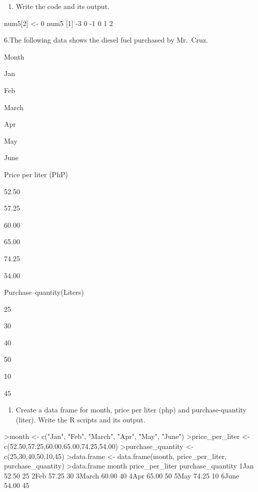 \documentclass[
]{article}
\newenvironment{Shaded}{\begin{snugshade}}{\end{snugshade}}
\newcommand{\NormalTok}[1]{#1}
\providecommand{\tightlist}{%
  \setlength{\itemsep}{0pt}\setlength{\parskip}{0pt}}
\begin{document}
\begin{enumerate}
\def\labelenumi{\alph{enumi}.}
\setcounter{enumi}{1}
\tightlist
\item
  Write the code and its output.
\end{enumerate}

\begin{Shaded}
\begin{Highlighting}[]
\NormalTok{num5[2] \textless{}{-} 0}
\NormalTok{num5}
\NormalTok{[1] {-}3  0 {-}1  0  1  2}
\end{Highlighting}
\end{Shaded}

6.The following data shows the diesel fuel purchased by Mr.~Cruz.

Month

Jan

Feb

March

Apr

May

June

Price per liter (PhP)

52.50

57.25

60.00

65.00

74.25

54.00

Purchase--quantity(Liters)

25

30

40

50

10

45

\begin{enumerate}
\def\labelenumi{\alph{enumi}.}
\tightlist
\item
  Create a data frame for month, price per liter (php) and
  purchase-quantity (liter). Write the R scripts and its output.
\end{enumerate}

\begin{Shaded}
\begin{Highlighting}[]
\NormalTok{\textgreater{}month \textless{}{-} c("Jan", "Feb", "March", "Apr", "May", "June")}
\NormalTok{\textgreater{}price\_per\_liter \textless{}{-} c(52.50,57.25,60.00,65.00,74.25,54.00)}
\NormalTok{\textgreater{}purchase\_quantity \textless{}{-} c(25,30,40,50,10,45)}
\NormalTok{\textgreater{}data.frame \textless{}{-} data.frame(month,  price\_per\_liter,  purchase\_quantity)}
\NormalTok{\textgreater{}data.frame}
\NormalTok{month price\_per\_liter purchase\_quantity}
\NormalTok{1Jan           52.50                25}
\NormalTok{2Feb           57.25                30}
\NormalTok{3March         60.00                40}
\NormalTok{4Apr           65.00                50}
\NormalTok{5May           74.25                10}
\NormalTok{6June          54.00                45}
\end{Highlighting}
\end{Shaded}
\end{document}
